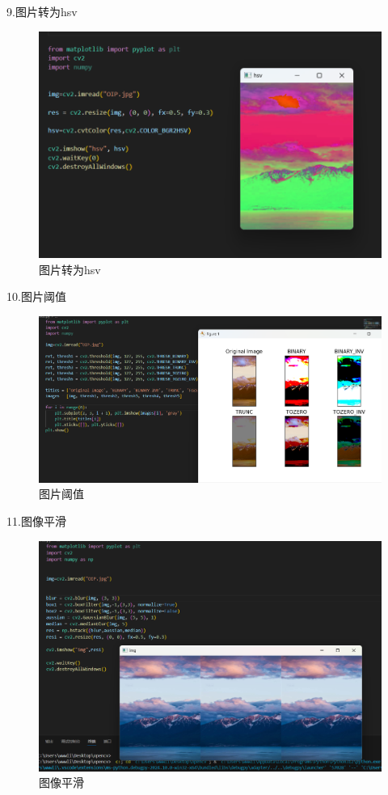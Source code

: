 \documentclass[a4paper, 12pt]{article}
\begin{document}
9.图片转为hsv
\begin{figure}[H]
  \centering
  \includegraphics[width=1\textwidth]{屏幕截图 2024-09-12 192953.png}
  \caption{图片转为hsv}
    \end{figure}

10.图片阈值
\begin{figure}[H]
  \centering
  \includegraphics[width=1\textwidth]{屏幕截图 2024-09-12 194017.png}
  \caption{图片阈值}
    \end{figure}


11.图像平滑
\begin{figure}[H]
  \centering
  \includegraphics[width=\textwidth]{屏幕截图 2024-09-12 200700.png}
  \caption{图像平滑}
\end{figure}
\end{document}
